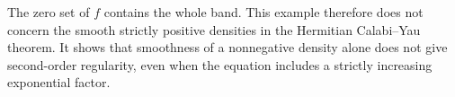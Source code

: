 The zero set of $f$ contains the whole band. This example therefore does not concern the smooth strictly positive densities in the Hermitian Calabi--Yau theorem. It shows that smoothness of a nonnegative density alone does not give second-order regularity, even when the equation includes a strictly increasing exponential factor.
